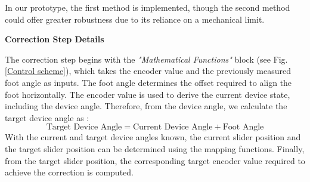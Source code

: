 \documentclass[lettersize,journal]{IEEEtran}
\begin{document}
\medskip

In our prototype, the first method is implemented, though the second method could offer greater robustness due to its reliance on a mechanical limit.




\medskip
\noindent\textbf{Correction Step Details}


The correction step begins with the \textit{"Mathematical Functions"} block (see Fig. \ref{Control scheme}), which takes the encoder value and the previously measured foot angle as inputs. The foot angle determines the offset required to align the foot horizontally. The encoder value is used to derive the current device state, including the device angle. Therefore, from the device angle, we calculate the target device angle as :  
\[
\text{Target Device Angle} = \text{Current Device Angle} + \text{Foot Angle}
\]
With the current and target device angles known, the current slider position and the target slider position can be determined using the mapping functions. Finally, from the target slider position, the corresponding target encoder value required to achieve the correction is computed.

\end{document}
